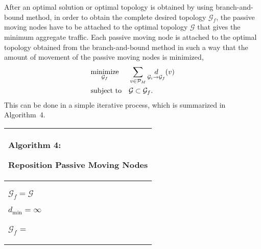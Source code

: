 \documentclass[10pt,conference]{IEEEtran}
\begin{document}
After an optimal solution or optimal topology is obtained by using
branch-and-bound method, in order to obtain the complete desired
topology $\mathcal{G}_{f}$, the passive moving nodes have to be
attached to the optimal topology $\mathcal{G}$ that gives the minimum
aggregate traffic. Each passive moving node is attached to the optimal
topology obtained from the branch-and-bound method in such a way that
the amount of movement of the passive moving nodes is minimized,
\begin{equation}
\label{eq:min_3}
\begin{aligned}
&\underset{\mathcal{G}_{f}}{\text{minimize}} &&\sum_{v \in \mathcal{P}_M} \underset{\mathcal{G}_{i} \rightarrow \mathcal{G}_{f}}{d}(v) \\
&\text{subject to} &&\mathcal{G} \subset \mathcal{G}_{f}.\\
\end{aligned}
\end{equation}
This can be done in a simple
iterative process, which is summarized in Algorithm~4.
\begin{algorithm}[t]

\begin{tabular}[c]{p{8cm}}


  \hline
  {\scriptsize
    \begin{bf}Algorithm 4: \end{bf} Reposition Passive
    Moving Nodes }\\
  \hline
\SetKwFunction{AN}{AttachNode}
\SetKwFunction{GAL}{GetAnchorLabel}
\SetKwFunction{GDL}{GetDesiredLabel}

{\scriptsize
  \KwIn{$\mathcal{G} = (\mathcal{V},\mathcal{E})$, graph
    with all active moving nodes attached to graph of non-moving
    nodes, $\mathcal{G}'$, according to optimization
    routine; \PM , set of passive moving nodes }

\KwOut{$\mathcal{G}_f= (\mathcal{V}_f, \mathcal{E}_f)$, final graph
  topology with passive moving nodes attached}

$\mathcal{G}_{f} = \mathcal{G}$\; 
\ForEach{$u \in \PM$} {

  $d_{\min} = \infty$ \;

\ForEach{$v \in \mathcal{V}$}{

$\mathcal{G}_{tmp}$ = \AN{u,v,$\mathcal{G}$} \;

$d = \underset{\mathcal{G}_{i} \rightarrow \mathcal{G}_{tmp}}{d}(v)$ \;

\If{$ \left(  d \leq h_{v} \right) \cap \left( d < d_{\min} \right)  $}{
  $v_{\min} =v$ \;
  $d_{\min} = d$ \;

 }


}
$\mathcal{G}_{f}$ = \AN{u,$v_{\min}$,$\mathcal{G}_{f}$}\;



}

}
\\
\hline


\end{tabular}

\end{algorithm}
\end{document}
